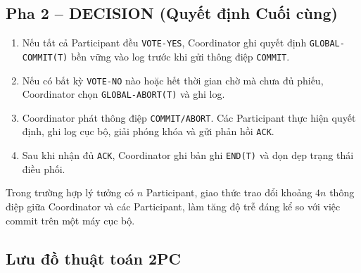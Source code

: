 \documentclass[12pt,a4paper]{report}
\begin{document}
\subsection{Pha 2 -- DECISION (Quyết định Cuối cùng)}
\begin{enumerate}[leftmargin=0.8cm, topsep=1pt, itemsep=1pt]
    \item Nếu tất cả Participant đều \texttt{VOTE-YES}, Coordinator ghi quyết định \texttt{GLOBAL-COMMIT(T)} bền vững vào log trước khi gửi thông điệp \texttt{COMMIT}.
    \item Nếu có bất kỳ \texttt{VOTE-NO} nào hoặc hết thời gian chờ mà chưa đủ phiếu, Coordinator chọn \texttt{GLOBAL-ABORT(T)} và ghi log.
    \item Coordinator phát thông điệp \texttt{COMMIT/ABORT}. Các Participant thực hiện quyết định, ghi log cục bộ, giải phóng khóa và gửi phản hồi \texttt{ACK}.
    \item Sau khi nhận đủ \texttt{ACK}, Coordinator ghi bản ghi \texttt{END(T)} và dọn dẹp trạng thái điều phối.
\end{enumerate}
Trong trường hợp lý tưởng có $n$ Participant, giao thức trao đổi khoảng $4n$ thông điệp giữa Coordinator và các Participant, làm tăng độ trễ đáng kể so với việc commit trên một máy cục bộ.

\subsection{Lưu đồ thuật toán 2PC}
\end{document}
